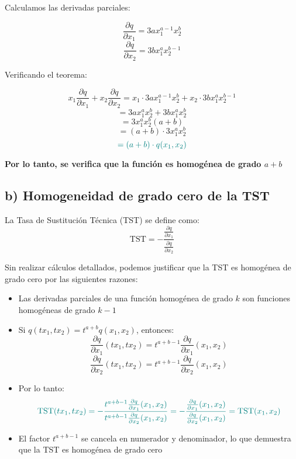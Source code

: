\documentclass{article}
\begin{document}
Calculamos las derivadas parciales:

\[
\frac{\partial q}{\partial x_1} = 3a x_1^{a-1} x_2^b
\]
\[
\frac{\partial q}{\partial x_2} = 3b x_1^a x_2^{b-1}
\]

Verificando el teorema:

\[
x_1\frac{\partial q}{\partial x_1} + x_2\frac{\partial q}{\partial x_2}
= x_1 \cdot 3a x_1^{a-1}x_2^b + x_2 \cdot 3b x_1^a x_2^{b-1}
\]
\[
= 3a x_1^a x_2^b + 3b x_1^a x_2^b
\]
\[
= 3x_1^a x_2^b (a+b)
\]
\[
= (a+b) \cdot 3x_1^a x_2^b
\]
\[
\color{teal}
= (a+b) \cdot q(x_1,x_2)
\]

\textbf{\color{teal}Por lo tanto, se verifica que la función es homogénea de grado \(a+b\)}

\subsection*{b) Homogeneidad de grado cero de la TST}

La Tasa de Sustitución Técnica (TST) se define como:
\[
\text{TST} = -\frac{\frac{\partial q}{\partial x_1}}{\frac{\partial q}{\partial x_2}}
\]

Sin realizar cálculos detallados, podemos justificar que la TST es homogénea de grado cero por las siguientes razones:

\begin{itemize}
    \item Las derivadas parciales de una función homogénea de grado \(k\) son funciones homogéneas de grado \(k-1\)
    
    \item Si \(q(tx_1,tx_2) = t^{a+b}q(x_1,x_2)\), entonces:
    \[
    \frac{\partial q}{\partial x_1}(tx_1,tx_2) = t^{a+b-1} \frac{\partial q}{\partial x_1}(x_1,x_2)
    \]
    \[
    \frac{\partial q}{\partial x_2}(tx_1,tx_2) = t^{a+b-1} \frac{\partial q}{\partial x_2}(x_1,x_2)
    \]
    
    \item Por lo tanto:
    \[
    \color{teal}
    \text{TST}(tx_1,tx_2) = -\frac{t^{a+b-1}\frac{\partial q}{\partial x_1}(x_1,x_2)}{t^{a+b-1}\frac{\partial q}{\partial x_2}(x_1,x_2)}
    = -\frac{\frac{\partial q}{\partial x_1}(x_1,x_2)}{\frac{\partial q}{\partial x_2}(x_1,x_2)}
    = \text{TST}(x_1,x_2)
    \]
    
    \item El factor \(t^{a+b-1}\) se cancela en numerador y denominador, lo que demuestra que la TST es homogénea de grado cero
\end{itemize}
\end{document}
